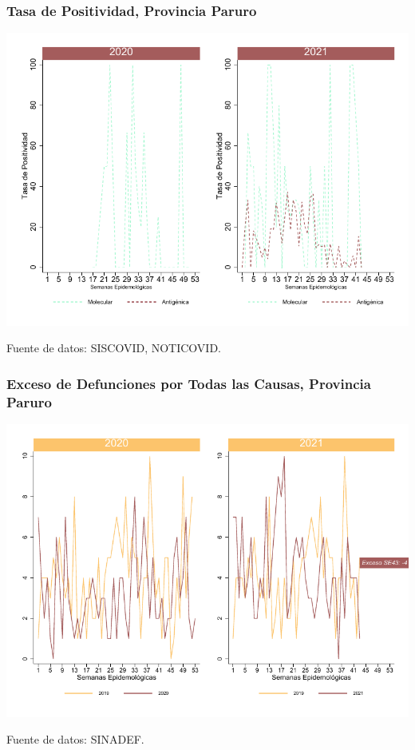 \documentclass[xcolor=table]{beamer}
\begin{document}
\begin{frame}
	\frametitle{Tasa de Positividad, Provincia Paruro}
	\vspace{-.5cm}
	\begin{center}
		\includegraphics[width=0.8\linewidth, trim={0cm .5cm 0cm 0.2cm},clip]{../figuras/positividad_20_21_10.pdf}
	\end{center}
	{\tiny Fuente de datos: SISCOVID, NOTICOVID.}
\end{frame}

\begin{frame}
	\frametitle{Exceso de Defunciones por Todas las Causas, Provincia Paruro}
	\vspace{-.5cm}
	\begin{center}
		\includegraphics[width=0.8\linewidth, trim={0cm .5cm 0cm 0.2cm},clip]{../figuras/exceso_10.pdf}
	\end{center}
	{\tiny Fuente de datos: SINADEF.}
	
	\hyperlink{indicadores_provinciales}{}
\end{frame}
\end{document}
